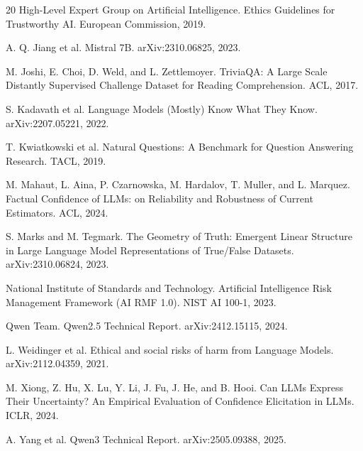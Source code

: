 \documentclass{article}
\begin{document}
\begin{thebibliography}{20}
High-Level Expert Group on Artificial Intelligence.
\newblock Ethics Guidelines for Trustworthy AI.
\newblock European Commission, 2019.

A. Q. Jiang et al.
\newblock Mistral 7B.
\newblock arXiv:2310.06825, 2023.

M. Joshi, E. Choi, D. Weld, and L. Zettlemoyer.
\newblock TriviaQA: A Large Scale Distantly Supervised Challenge Dataset for Reading Comprehension.
\newblock ACL, 2017.

S. Kadavath et al.
\newblock Language Models (Mostly) Know What They Know.
\newblock arXiv:2207.05221, 2022.

T. Kwiatkowski et al.
\newblock Natural Questions: A Benchmark for Question Answering Research.
\newblock TACL, 2019.

M. Mahaut, L. Aina, P. Czarnowska, M. Hardalov, T. Muller, and L. Marquez.
\newblock Factual Confidence of LLMs: on Reliability and Robustness of Current Estimators.
\newblock ACL, 2024.

S. Marks and M. Tegmark.
\newblock The Geometry of Truth: Emergent Linear Structure in Large Language Model Representations of True/False Datasets.
\newblock arXiv:2310.06824, 2023.

National Institute of Standards and Technology.
\newblock Artificial Intelligence Risk Management Framework (AI RMF 1.0).
\newblock NIST AI 100-1, 2023.

Qwen Team.
\newblock Qwen2.5 Technical Report.
\newblock arXiv:2412.15115, 2024.

L. Weidinger et al.
\newblock Ethical and social risks of harm from Language Models.
\newblock arXiv:2112.04359, 2021.

M. Xiong, Z. Hu, X. Lu, Y. Li, J. Fu, J. He, and B. Hooi.
\newblock Can LLMs Express Their Uncertainty? An Empirical Evaluation of Confidence Elicitation in LLMs.
\newblock ICLR, 2024.

A. Yang et al.
\newblock Qwen3 Technical Report.
\newblock arXiv:2505.09388, 2025.

\end{thebibliography}
\endgroup
\end{document}
